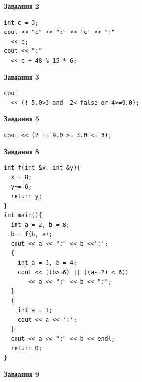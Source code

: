 \documentclass[12pt, ukrainian]{article}
\begin{document}
{\begin {large}
\begin{minipage}[t]{7.0cm}
\end{minipage}
\vline \hspace{1mm}
\begin{minipage}[t]{11.0cm}

\begin{center}
\textbf{Завдання 2}
\end{center}
\vspace{-8mm}

\begin{verbatim}
int c = 3;
cout << "c" << ":" << 'c' << ":" 
  << c;
cout << ":" 
  << c + 48 % 15 * 6;
\end{verbatim}



\begin{center}
\textbf{Завдання 3}
\end{center}
\vspace{-8mm}

\begin{verbatim}
cout 
  << (! 5.0>3 and  2< false or 4>=9.0);
\end{verbatim}



\begin{center}
\textbf{Завдання 5}
\end{center}
\vspace{-8mm}

\begin{verbatim}
cout << (2 != 9.0 >= 3.0 <= 3);
\end{verbatim}



\begin{center}
\textbf{Завдання 8}
\end{center}
\vspace{-8mm}

\begin{verbatim}
int f(int &x, int &y){
  x = 8;
  y+= 6;
  return y;
}
int main(){
  int a = 2, b = 8;
  b = f(b, a);
  cout << a << ":" << b <<':';
  {
    int a = 3, b = 4;
    cout << ((b>=6) || ((a-=2) < 6))
       << a << ":" << b << ":";
  }
  {
    int a = 1;
    cout << a << ':';
  }
  cout << a << ":" << b << endl;
  return 0;
}
\end{verbatim}

\end{minipage}


\begin{minipage}[t]{7.0cm}

\begin{center}
\textbf{Завдання 9}
\end{center}
\vspace{-8mm}


\end{minipage}
\end{large}}
\end{document}

